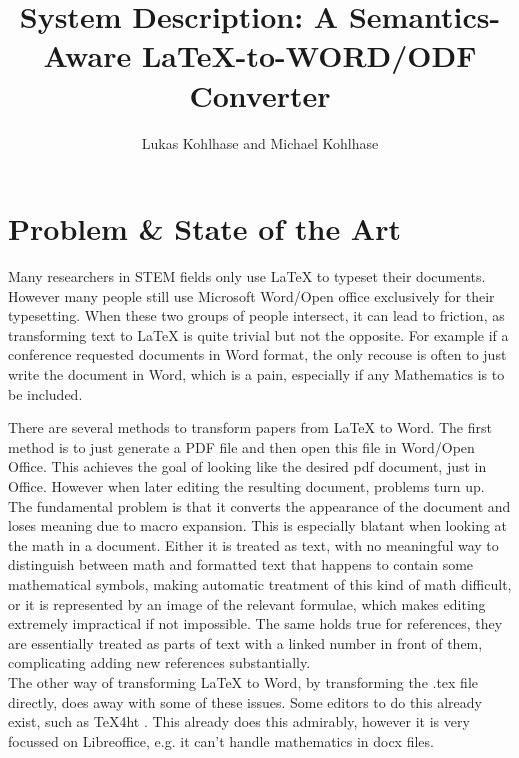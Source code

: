 \documentclass[draft]{llncs}
\title{System Description: A Semantics-Aware {\LaTeX}-to-WORD/ODF Converter}
\author{Lukas Kohlhase and Michael Kohlhase}
\institute{
  Math/CS, Jacobs University Bremen}
\begin{document}
\maketitle
\begin{abstract}
\end{abstract}

\section{Problem \& State of the Art}\label{sec:intro}

Many researchers in STEM fields only use {\LaTeX} to typeset their documents. However many
people still use Microsoft Word/Open office exclusively for their typesetting. When these
two groups of people intersect, it can lead to friction, as transforming text to {\LaTeX}
is quite trivial but not the opposite. For example if a conference requested documents in
Word format, the only recouse is often to just write the document in Word, which is a
pain, especially if any Mathematics is to be included.


There are several methods to transform papers from {\LaTeX} to Word. The first method is
to just generate a PDF file and then open this file in Word/Open Office. This achieves the goal of looking like the desired pdf document, just in Office. However when later editing the resulting document, problems turn up. 
The fundamental problem is that it converts the appearance of the document and loses meaning due to macro expansion. This is especially blatant when looking at the math in a document. Either it is treated as text, with no meaningful way to distinguish between math and formatted text that happens to contain some mathematical symbols, making automatic treatment of this kind of math difficult, or it is represented by an image of the relevant formulae, which makes editing extremely impractical if not impossible. The same holds true for references, they are essentially treated as parts of text with a linked number in front of them, complicating adding new references substantially. \\ 
The other way of transforming {\LaTeX} to Word, by transforming the .tex file directly, does away with some of these issues. Some editors to do this already exist, such as TeX4ht . This already does this admirably, however it is very focussed on Libreoffice, e.g. it can't handle mathematics in docx files. 
\end{document}

